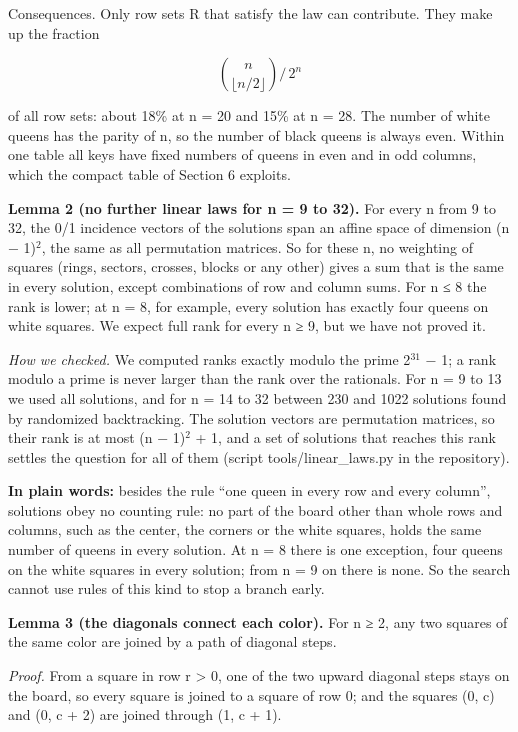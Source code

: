 Consequences. Only row sets R that satisfy the law can contribute. They make up the fraction

\[\binom{n}{\lfloor n/2 \rfloor} \Big/ \, 2^{n}\]

of all row sets: about 18\% at n = 20 and 15\% at n = 28. The number of white queens has the parity of n, so the number of black queens is always even. Within one table all keys have fixed numbers of queens in even and in odd columns, which the compact table of Section 6 exploits.

\textbf{Lemma 2 (no further linear laws for n = 9 to 32).} For every n from 9 to 32, the 0/1 incidence vectors of the solutions span an affine space of dimension (n − 1)$^{2}$, the same as all permutation matrices. So for these n, no weighting of squares (rings, sectors, crosses, blocks or any other) gives a sum that is the same in every solution, except combinations of row and column sums. For n ≤ 8 the rank is lower; at n = 8, for example, every solution has exactly four queens on white squares. We expect full rank for every n ≥ 9, but we have not proved it.

\emph{How we checked.} We computed ranks exactly modulo the prime 2$^{31}$ − 1; a rank modulo a prime is never larger than the rank over the rationals. For n = 9 to 13 we used all solutions, and for n = 14 to 32 between 230 and 1022 solutions found by randomized backtracking. The solution vectors are permutation matrices, so their rank is at most (n − 1)$^{2}$ + 1, and a set of solutions that reaches this rank settles the question for all of them (script tools/linear\_laws.py in the repository).

\textbf{In plain words:} besides the rule “one queen in every row and every column”, solutions obey no counting rule: no part of the board other than whole rows and columns, such as the center, the corners or the white squares, holds the same number of queens in every solution. At n = 8 there is one exception, four queens on the white squares in every solution; from n = 9 on there is none. So the search cannot use rules of this kind to stop a branch early.

\textbf{Lemma 3 (the diagonals connect each color).} For n ≥ 2, any two squares of the same color are joined by a path of diagonal steps.

\emph{Proof.} From a square in row r > 0, one of the two upward diagonal steps stays on the board, so every square is joined to a square of row 0; and the squares (0, c) and (0, c + 2) are joined through (1, c + 1).

